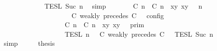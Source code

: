 \begin{isabellebody}
\ \ \ \ \ \ \ \ \ \ {\isasyminter}\ {\isasymlbrakk}{\isasymlbrakk}\ {\isasymPhi}\ {\isasymrbrakk}{\isasymrbrakk}\isactrlsub T\isactrlsub E\isactrlsub S\isactrlsub L\isactrlbsup {\isasymge}\ Suc\ n\isactrlesup {\isacartoucheclose}\ \isamarkupfalse%
\ simp\isanewline
\ \ \isamarkupfalse%
\ \isamarkupfalse%
\ {\isacartoucheopen}{\isasymlbrakk}\ {\isacharparenleft}{\isacharparenleft}{\isasymlceil}{\isacharhash}\isactrlsup {\isasymle}\ C\ n{\isacharcomma}\ {\isacharhash}\isactrlsup {\isasymle}\ C\ n{\isasymrceil}\ {\isasymin}\ {\isacharparenleft}{\isasymlambda}{\isacharparenleft}x{\isacharcomma}y{\isacharparenright}{\isachardot}\ x{\isasymle}y{\isacharparenright}{\isacharparenright}\ {\isacharhash}\ {\isasymGamma}{\isacharparenright}{\isacharcomma}\ n\isanewline
\ \ \ \ \ \ \ \ \ \ \ \ \ \ \ \ \ \ {\isasymturnstile}\ {\isasymPsi}\ {\isasymtriangleright}\ {\isacharparenleft}{\isacharparenleft}C\ weakly\ precedes\ C\ {\isacharhash}\ {\isasymPhi}{\isacharparenright}\ {\isasymrbrakk}\isactrlsub c\isactrlsub o\isactrlsub n\isactrlsub f\isactrlsub i\isactrlsub g\isanewline
\ \ \ \ \ \ \ \ \ \ \ \ \ \ \ \ {\isacharequal}\ {\isasymlbrakk}{\isasymlbrakk}\ {\isacharparenleft}{\isasymlceil}{\isacharhash}\isactrlsup {\isasymle}\ C\ n{\isacharcomma}\ {\isacharhash}\isactrlsup {\isasymle}\ C\ n{\isasymrceil}\ {\isasymin}\ {\isacharparenleft}{\isasymlambda}{\isacharparenleft}x{\isacharcomma}y{\isacharparenright}{\isachardot}\ x{\isasymle}y{\isacharparenright}{\isacharparenright}\ {\isacharhash}\ {\isasymGamma}\ {\isasymrbrakk}{\isasymrbrakk}\isactrlsub p\isactrlsub r\isactrlsub i\isactrlsub m\isanewline
\ \ \ \ \ \ \ \ \ \ \ \ \ \ \ \ {\isasyminter}\ {\isasymlbrakk}{\isasymlbrakk}\ {\isasymPsi}\ {\isasymrbrakk}{\isasymrbrakk}\isactrlsub T\isactrlsub E\isactrlsub S\isactrlsub L\isactrlbsup {\isasymge}\ n\isactrlesup \ {\isasyminter}\ {\isasymlbrakk}{\isasymlbrakk}\ {\isacharparenleft}C\ weakly\ precedes\ C\ {\isacharhash}\ {\isasymPhi}\ {\isasymrbrakk}{\isasymrbrakk}\isactrlsub T\isactrlsub E\isactrlsub S\isactrlsub L\isactrlbsup {\isasymge}\ Suc\ n\isactrlesup {\isacartoucheclose}\isanewline
\ \ \ \ \isamarkupfalse%
\ simp\isanewline
\ \ \isamarkupfalse%
\ \isamarkupfalse%
\ {\isacharquery}thesis\isanewline
\ \ \isamarkupfalse%

\end{isabellebody}
